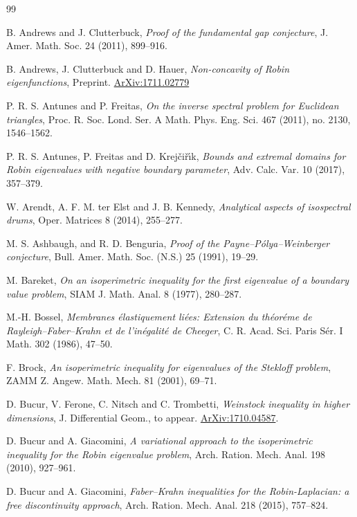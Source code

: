 \documentclass[12pt,reqno]{amsart}
\theoremstyle{definition}
\newcommand{\arxiv}[1]{%
 \href{http://front.math.ucdavis.edu/#1}{ArXiv:#1}}
\begin{document}
\begin{thebibliography}{99}

B. Andrews and J. Clutterbuck, \emph{Proof of the fundamental gap conjecture}, J. Amer. Math. Soc. 24 (2011), 899--916.

B. Andrews, J. Clutterbuck and D. Hauer, \emph{Non-concavity of Robin eigenfunctions}, Preprint. \arxiv{1711.02779}

P. R. S. Antunes and P. Freitas, \emph{On the inverse spectral problem for Euclidean triangles}, Proc. R. Soc. Lond. Ser. A Math. Phys. Eng. Sci. 467 (2011), no. 2130, 1546--1562.

P. R. S. Antunes, P. Freitas and D. Krej\v{c}i\v{r}\'{\i}k, \emph{Bounds and extremal domains for Robin eigenvalues with negative boundary parameter}, Adv. Calc. Var. 10 (2017), 357--379. 

W. Arendt, A. F. M. ter Elst and J. B. Kennedy, \emph{Analytical aspects of isospectral drums}, 
Oper. Matrices 8 (2014), 255--277. 

M. S. Ashbaugh, and R. D. Benguria, \emph{Proof of the Payne--P\'{o}lya--Weinberger conjecture}, Bull. Amer. Math. Soc. (N.S.) 25 (1991), 19--29. 

M. Bareket, \emph{On an isoperimetric inequality for the first eigenvalue of a
  boundary value problem}, SIAM J. Math. Anal. 8 (1977), 280--287.

M.-H. Bossel, \emph{Membranes {\'{e}}lastiquement li{\'{e}}es: Extension du th{\'{e}}or{\'{e}}me de Rayleigh--Faber--{K}rahn et de l'in{\'{e}}galit{\'{e}} de Cheeger}, C. R. Acad. Sci. Paris S\'{e}r. I Math. 302 (1986), 47--50.

F. Brock, \emph{An isoperimetric inequality for eigenvalues of the Stekloff problem}, ZAMM Z. Angew. Math. Mech. 81 (2001), 69--71.

D. Bucur, V. Ferone, C. Nitsch and C. Trombetti, \emph{Weinstock inequality in higher dimensions}, J. Differential Geom., to appear. \arxiv{1710.04587}.

D. Bucur and A. Giacomini, \emph{A variational approach to the isoperimetric inequality for the Robin eigenvalue problem}, Arch. Ration. Mech. Anal. 198 (2010), 927--961.

D. Bucur and A. Giacomini, \emph{Faber--Krahn inequalities for the Robin-Laplacian: a free discontinuity approach}, Arch. Ration. Mech. Anal. 218 (2015), 757--824. 


\end{thebibliography}
\end{document}

